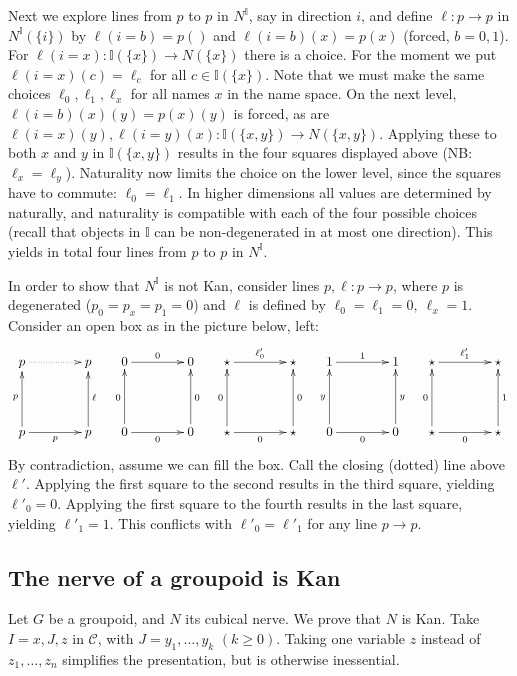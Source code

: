 \documentclass[10pt,a4paper]{article}
\newcommand{\CC}{{\mathcal C}}
\newcommand{\set}[1]{\{#1\}}
\newcommand{\interval}{\mathbb{I}}
\begin{document}
Next we explore lines from $p$ to $p$ in $N^\interval$, say in
direction $i$, and define $\ell:p\to p$ in $N^\interval(\set{i})$ by
$\ell(i=b) = p()$ and $\ell(i=b)(x) = p(x)$ (forced, $b=0,1$).  For
$\ell(i=x): \interval(\set{x})\to N(\set{x})$ there is a choice. For
the moment we put $\ell(i=x)(c) = \ell_c$ for all $c\in
\interval(\set{x})$. Note that we must make the same choices
$\ell_0,\ell_1,\ell_x$ for all names $x$ in the name space.  On the
next level, $\ell(i=b)(x)(y) = p(x)(y)$ is forced, as are
$\ell(i=x)(y),\ell(i=y)(x): \interval(\set{x,y})\to N(\set{x,y})$.
Applying these to both $x$ and $y$ in $\interval(\set{x,y})$ results
in the four squares displayed above (NB: $\ell_x=\ell_y$).  Naturality
now limits the choice on the lower level, since the squares have to
commute: $\ell_0 = \ell_1$.  In higher dimensions all values are
determined by naturally, and naturality is compatible with each of the
four possible choices (recall that objects in $\interval$ can be
non-degenerated in at most one direction).  This yields in total four
lines from $p$ to $p$ in $N^\interval$.

In order to show that $N^\interval$ is not Kan, consider lines
$p,\ell: p\to p$, where $p$ is degenerated ($p_0=p_x=p_1=0$) and
$\ell$ is defined by $\ell_0=\ell_1=0,~\ell_x=1$.  Consider an open
box as in the picture below, left:
\[
\xymatrix@R=.6cm@C=.6cm{
p\ar@{.>}[rr]&      & p   &  0\ar[rr]^{0}&      & 0  &  \star\ar[rr]^{\ell'_0}&      & \star
&  1\ar[rr]^{1}&      & 1 &  \star\ar[rr]^{\ell'_1}&      & \star \\
                    &&    &        &&    &    &&       &        &&    &    &&       \\
p\ar[rr]_{p}\ar[uu]^{p}& & p\ar[uu]_{\ell} &
0\ar[rr]_{0}\ar[uu]^{0}& & 0\ar[uu]_{0}    &
\star\ar[rr]_{0}\ar[uu]^{0}& & \star\ar[uu]_{0}  &
0\ar[rr]_{0}\ar[uu]^{y}& & 0\ar[uu]_{y}    &
\star\ar[rr]_{0}\ar[uu]^{0}& & \star\ar[uu]_{1}     \\
}
\]
By contradiction, assume we can fill the box.  Call the closing
(dotted) line above $\ell'$.  Applying the first square to the second
results in the third square, yielding $\ell'_0 = 0$.  Applying the
first square to the fourth results in the last square, yielding
$\ell'_1 = 1$.  This conflicts with $\ell'_0 = \ell'_1$ for any line
$p\to p$.

\subsection{The nerve of a groupoid is Kan}\label{sec:groupoidnerve}
Let $G$ be a groupoid, and $N$ its cubical nerve.
We prove that $N$ is Kan. Take $I=x,J,z$ in $\CC$,
with $J=y_1,\ldots,y_k$ $(k\geq 0)$. Taking one variable $z$ instead of
$z_1,\ldots,z_n$ simplifies the presentation, but is otherwise inessential.
\end{document}
